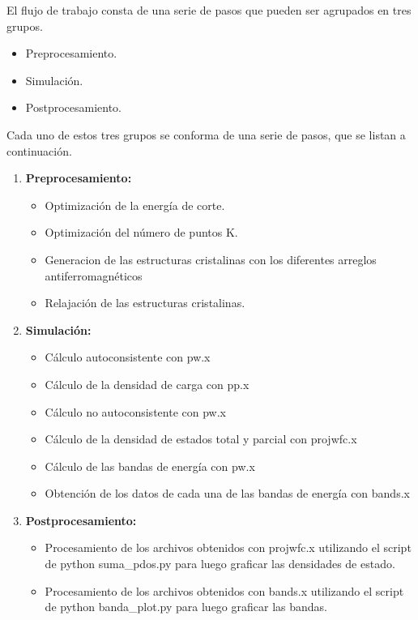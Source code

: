 El flujo de trabajo consta de una serie de pasos que pueden ser agrupados en 
tres grupos.

\begin{itemize}
    \item Preprocesamiento.
    \item Simulaci\'on.
    \item Postprocesamiento.
\end{itemize}

\noindent Cada uno de estos tres grupos se conforma de una serie de pasos, que 
se listan 
a continuaci\'on.

\begin{enumerate}
    \item \textbf{Preprocesamiento:}
        \begin{itemize}
            \item Optimizaci\'on de la energ\'ia de corte.
            \item Optimizaci\'on del n\'umero de puntos K.
            \item Generacion de las estructuras cristalinas con los diferentes 
            arreglos antiferromagn\'eticos
            \item Relajaci\'on de las estructuras cristalinas.
        \end{itemize}
    \item \textbf{Simulaci\'on:}
        \begin{itemize}
            \item C\'alculo autoconsistente con pw.x
            \item C\'alculo de la densidad de carga con pp.x
            \item C\'alculo no autoconsistente con pw.x
            \item C\'alculo de la densidad de estados total y parcial con 
            projwfc.x
            \item C\'alculo de las bandas de energ\'ia con pw.x
            \item Obtenci\'on de los datos de cada una de las bandas de 
            energ\'ia con bands.x
        \end{itemize}
    \item \textbf{Postprocesamiento:}
        \begin{itemize}
            \item Procesamiento de los archivos obtenidos con projwfc.x 
            utilizando el script de python suma\_pdos.py para luego graficar 
            las densidades de estado.
            \item Procesamiento de los archivos obtenidos con bands.x 
            utilizando el script de python banda\_plot.py para luego graficar 
            las bandas.
        \end{itemize}
\end{enumerate}


